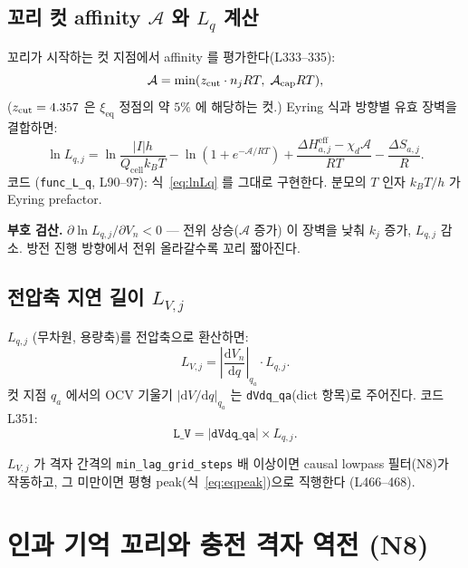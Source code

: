 \documentclass[11pt,a4paper]{article}
\newcommand{\dd}{\mathrm{d}}
\newcommand{\eff}{\mathrm{eff}}
\newcommand{\eq}{\mathrm{eq}}
\newcommand{\cell}{\mathrm{cell}}
\begin{document}
\subsection{꼬리 컷 affinity $\mathcal{A}$ 와 $L_q$ 계산}

꼬리가 시작하는 컷 지점에서 affinity 를 평가한다(L333--335):
\begin{equation}
\mathcal{A} = \min(z_{\rm cut}\cdot n_j RT,\; \mathcal{A}_{\rm cap} RT),
\label{eq:Acut}
\end{equation}
($z_{\rm cut}=4.357$ 은 $\xi_{\eq}$ 정점의 약 $5\%$ 에 해당하는 컷.) Eyring 식과 방향별
유효 장벽을 결합하면:
\begin{equation}
\ln L_{q,j} = \ln\frac{|I|h}{Q_\cell k_B T} - \ln\left(1+e^{-\mathcal{A}/RT}\right)
+ \frac{\Delta H_{a,j}^\eff - \chi_d\mathcal{A}}{RT} - \frac{\Delta S_{a,j}}{R}.
\label{eq:lnLq}
\end{equation}
코드 (\texttt{func\_L\_q}, L90--97):
식~\eqref{eq:lnLq} 를 그대로 구현한다. 분모의 $T$ 인자 $k_BT/h$ 가 Eyring prefactor.

\textbf{부호 검산.} $\partial\ln L_{q,j}/\partial V_n < 0$ — 전위 상승($\mathcal{A}$ 증가)
이 장벽을 낮춰 $k_j$ 증가, $L_{q,j}$ 감소. 방전 진행 방향에서 전위 올라갈수록 꼬리
짧아진다.

\subsection{전압축 지연 길이 $L_{V,j}$}

$L_{q,j}$ (무차원, 용량축)를 전압축으로 환산하면:
\begin{equation}
L_{V,j} = \left|\frac{\dd V_n}{\dd q}\right|_{q_a}\cdot L_{q,j}.
\label{eq:LV}
\end{equation}
컷 지점 $q_a$ 에서의 OCV 기울기 $|\dd V/\dd q|_{q_a}$ 는 \texttt{dVdq\_qa}(dict 항목)로
주어진다. 코드 L351:
\begin{equation*}
\texttt{L\_V} = |\texttt{dVdq\_qa}|\times L_{q,j}.
\end{equation*}

$L_{V,j}$ 가 격자 간격의 \texttt{min\_lag\_grid\_steps} 배 이상이면 causal lowpass
필터(N8)가 작동하고, 그 미만이면 평형 peak(식~\eqref{eq:eqpeak})으로 직행한다
(L466--468).

\section{인과 기억 꼬리와 충전 격자 역전 (N8)}\label{sec:tail}
\end{document}
